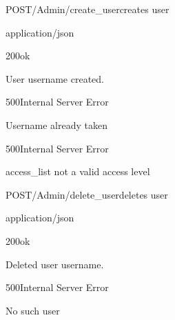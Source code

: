 \documentclass[12pt, etter]{article}
\begin{document}
\begin{apiRoute}{POST}{/Admin/create\_user}{creates user}
    \begin{routeParameter}
    \end{routeParameter}
    \begin{routeResponse}{application/json}
        \begin{routeResponseItem}{200}{ok}
            \begin{routeResponseItemBody}
                User {username} created.
            \end{routeResponseItemBody}
        \end{routeResponseItem}
        \begin{routeResponseItem}{500}{Internal Server Error}
            \begin{routeResponseItemBody}
                Username already taken
            \end{routeResponseItemBody}
        \end{routeResponseItem}
        \begin{routeResponseItem}{500}{Internal Server Error}
            \begin{routeResponseItemBody}
                {access_list} not a valid access level
            \end{routeResponseItemBody}
        \end{routeResponseItem}
    \end{routeResponse}
\end{apiRoute}

\begin{apiRoute}{POST}{/Admin/delete\_user}{deletes user}
    \begin{routeParameter}
    \end{routeParameter}
    \begin{routeResponse}{application/json}
        \begin{routeResponseItem}{200}{ok}
            \begin{routeResponseItemBody}
                Deleted user {username}.
            \end{routeResponseItemBody}
        \end{routeResponseItem}
        \begin{routeResponseItem}{500}{Internal Server Error}
            \begin{routeResponseItemBody}
                No such user
            \end{routeResponseItemBody}
        \end{routeResponseItem}
    \end{routeResponse}
\end{apiRoute}
\end{document}
